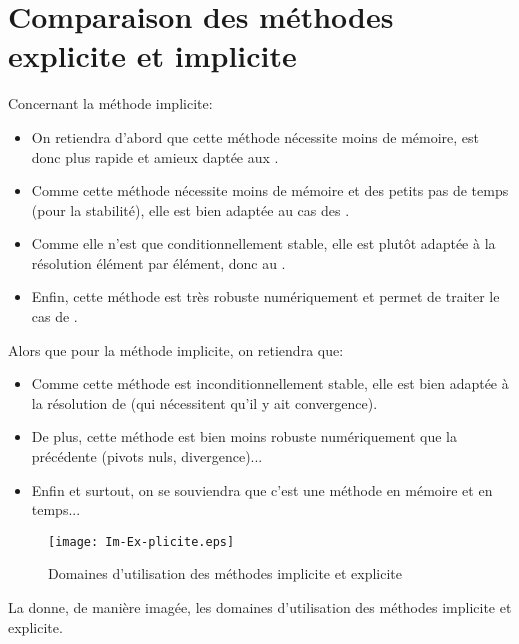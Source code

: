 \bigskip
\section{Comparaison des méthodes explicite et implicite}

\medskip
Concernant la méthode implicite:
\begin{itemize}
   \item On retiendra d'abord que cette méthode nécessite moins de mémoire, est donc plus
	rapide et amieux daptée aux .
   \item Comme cette méthode nécessite moins de mémoire et des petits pas de temps (pour la stabilité), 
	elle est bien adaptée au cas des .
   \item Comme elle n'est que conditionnellement stable, elle est plutôt adaptée à la résolution élément 
	par élément, donc au .
   \item Enfin, cette méthode est très robuste numériquement et permet de traiter le cas de 
	.
\end{itemize}

\medskip
Alors que pour la méthode implicite, on retiendra que:
\begin{itemize}
   \item Comme cette méthode est inconditionnellement stable, elle est bien adaptée à la résolution 
	de  (qui nécessitent qu'il y ait convergence).
   \item De plus, cette méthode est bien moins robuste numériquement que la précédente (pivots nuls,
	divergence)...
   \item Enfin et surtout, on se souviendra que c'est une méthode  en
	mémoire et en temps...
\end{itemize}

\medskip
\begin{figure}[htb]
\centerline{\texttt{[image: Im-Ex-plicite.eps]}}
\caption{Domaines d'utilisation des méthodes implicite et explicite}\label{Fig-Im-Ex-plicite}
\end{figure}
La  donne, de manière imagée, les domaines d'utilisation des méthodes implicite et explicite.


\ifVersionAvecExemplesSepares\else
\fi

